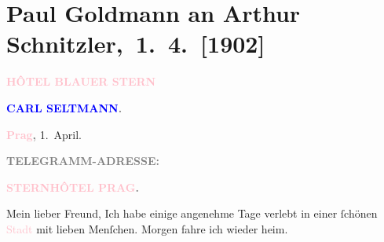 

\renewcommand{\erwaehntePersonen}{Personen: Richard Beer-Hofmann, Charlotte Bondy, Willi Handl, Hugo von Hofmannsthal, Hugo Salus, Olga Schnitzler, Carl Seltmann, Heinrich Teweles, Alice Ziegler, Arnost Ziegler}
\renewcommand{\erwaehnteOrte}{Orte: Berlin, Brühl, Böhmerwald, Hotel Blauer Stern, Prag, Wien}
\renewcommand{\erwaehnteWerke}{Werke: Die Zeit, Neue Freie Presse}
\section[ Paul Goldmann an Arthur Schnitzler, 1. 4. {[}1902{]}]{Paul Goldmann an Arthur Schnitzler, 1. 4. {[}1902{]}}
\nopagebreak{}
\rehead{ }\normalsize\beginnumbering{}
\toendnotes[C]{\smallbreak\pagebreak[2]}
\toendnotes[C]{\smallbreak}
\pstart
           \noindent{}{\pb}\textcolor{gray}{\textbf{\textsc{\textcolor{pink}{HÔTEL BLAUER STERN}{}\ledrightnote{\textcolor{pink}{Hotel Blauer Stern}}}}}\pend
           
\pstart
           \textcolor{gray}{\textbf{\textsc{\textbf{\textcolor{blue}{CARL SELTMANN}{}\ledrightnote{\textcolor{blue}{Carl Seltmann}}.}}}}\pend
           
\pstart
           \raggedleft{}\textcolor{gray}{\textbf{\textcolor{pink}{Prag}{}\ledrightnote{\textcolor{pink}{Prag}},}}{ }1. April.\pend
           
\pstart
           \textcolor{gray}{\textbf{TELEGRAMM-ADRESSE:}}\pend
           
\pstart
           \textcolor{gray}{\textbf{\textsc{\textcolor{pink}{STERNHÔTEL PRAG}{}\ledrightnote{\textcolor{pink}{Hotel Blauer Stern}}.}}}\pend
           
\pstart{}Mein lieber Freund,\pend
\pstart
           Ich habe einige angenehme Tage verlebt in einer ſchönen \textcolor{pink}{Stadt}{}\ledrightnote{{$\rightarrow$}\textcolor{pink}{Prag}} mit lieben Menſchen. Morgen fahre ich wieder heim.\pend
           
